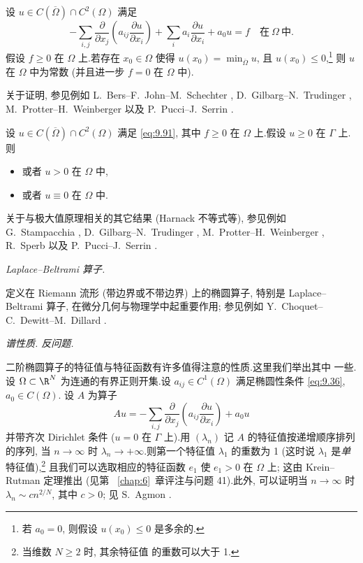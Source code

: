 \begin{keytheorem}[Hopf]
\label{thm:9.36}
设 $u\in C(\overline\Omega)\cap C^2(\Omega)$ 满足
\begin{equation}
-\sum_{i,j}\frac{\partial}{\partial x_j}
\left(a_{ij}\frac{\partial u}{\partial x_i}\right)
+\sum_ia_i\frac{\partial u}{\partial x_i}+a_0u=f
\quad\text{在}\ \Omega\ \text{中}.
\label{eq:9.91}
\end{equation}
假设 $f\ge0$ 在 $\Omega$ 上.若存在 $x_0\in\Omega$ 使得
$u(x_0)=\min_{\overline\Omega}u$, 且 $u(x_0)\le0$,\footnote{若 $a_0=0$,
则假设 $u(x_0)\le0$ 是多余的.} 则 $u$ 在 $\Omega$ 中为常数 (并且进一步
$f=0$ 在 $\Omega$ 中).
\end{keytheorem}

关于证明, 参见例如 L.~Bers--F.~John--M.~Schechter
, D.~Gilbarg--N.~Trudinger
, M.~Protter--H.~Weinberger
 以及 P.~Pucci--J.~Serrin
.

\begin{keycorollary}
\label{cor:9.37}
设 $u\in C(\overline\Omega)\cap C^2(\Omega)$ 满足 \eqref{eq:9.91},
其中 $f\ge0$ 在 $\Omega$ 上.假设 $u\ge0$ 在 $\Gamma$ 上.则
\begin{itemize}
	\item 或者 $u>0$ 在 $\Omega$ 中,
	\item 或者 $u\equiv0$ 在 $\Omega$ 中.
\end{itemize}
\end{keycorollary}

关于与极大值原理相关的其它结果 (Harnack 不等式等), 参见例如
G.~Stampacchia ,
D.~Gilbarg--N.~Trudinger ,
M.~Protter--H.~Weinberger ,
R.~Sperb  以及 P.~Pucci--J.~Serrin
.

 \emph{Laplace--Beltrami 算子.}

定义在 Riemann 流形 (带边界或不带边界) 上的椭圆算子, 特别是
Laplace--Beltrami 算子, 在微分几何与物理学中起重要作用; 参见例如
Y.~Choquet--C.~Dewitt--M.~Dillard .

 \emph{谱性质. 反问题.}

二阶椭圆算子的特征值与特征函数有许多值得注意的性质.这里我们举出其中
一些.设 $\Omega\subset\R^N$ 为连通的有界正则开集.设
$a_{ij}\in C^1(\Omega)$ 满足椭圆性条件 \eqref{eq:9.36}, $a_0\in C(\Omega)$.
设 $A$ 为算子
\begin{equation*}
Au=-\sum_{i,j}\frac{\partial}{\partial x_j}
\left(a_{ij}\frac{\partial u}{\partial x_i}\right)+a_0u
\end{equation*}
并带齐次 Dirichlet 条件 ($u=0$ 在 $\Gamma$ 上).用 $(\lambda_n)$ 记 $A$
的特征值按递增顺序排列的序列, 当 $n\to\infty$ 时
$\lambda_n\to+\infty$.则第一个特征值 $\lambda_1$ 的重数为 1 (这时说
$\lambda_1$ 是\emph{单}特征值),\footnote{当维数 $N\ge2$ 时, 其余特征值
的重数可以大于 1.} 且我们可以选取相应的特征函数 $e_1$ 使 $e_1>0$ 在
$\Omega$ 上; 这由 Krein--Rutman 定理推出 (见第~
\ref{chap:6}~章评注与问题 41).此外,
可以证明当 $n\to\infty$ 时 $\lambda_n\sim cn^{2/N}$, 其中 $c>0$; 见
S.~Agmon .

